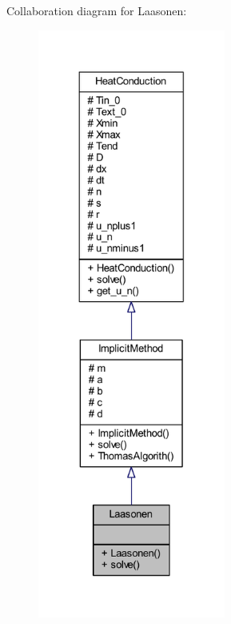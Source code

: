 Collaboration diagram for Laasonen\+:
\nopagebreak
\begin{figure}[H]
\begin{center}
\leavevmode
\includegraphics[height=550pt]{class_laasonen__coll__graph}
\end{center}
\end{figure}
